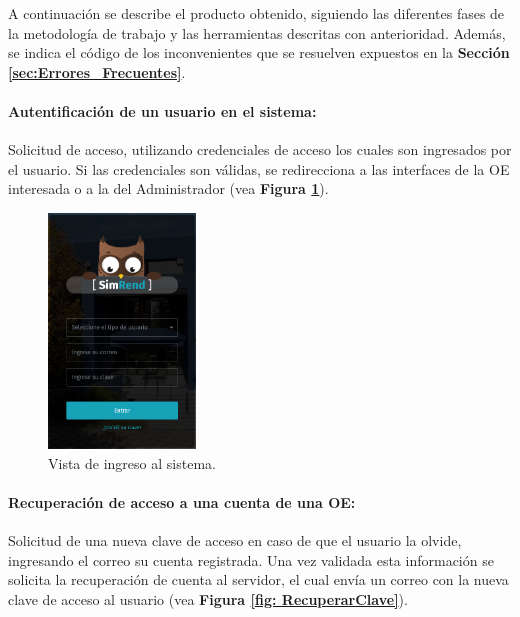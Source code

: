 A continuación se describe el producto obtenido, siguiendo las diferentes fases de la metodología de trabajo y las herramientas descritas con anterioridad. Además, se indica el código de los inconvenientes que se resuelven expuestos en la \textbf{Sección \ref{sec:Errores_Frecuentes}}.

\paragraph{Autentificación de un usuario en el sistema: } Solicitud de acceso, utilizando credenciales de acceso los cuales son ingresados por el usuario. Si las credenciales son válidas, se redirecciona a las interfaces de la OE interesada o a la del Administrador (vea \textbf{Figura \ref{fig: Login}}).

\begin{figure}[htbp]
    \centering
    \includegraphics[width=0.35\textwidth]{Imagenes/Login.PNG}
    \caption{\label{fig: Login}Vista de ingreso al sistema.}
\end{figure}

\paragraph{Recuperación de acceso a una cuenta de una OE: } Solicitud de una nueva clave de acceso en caso de que el usuario la olvide, ingresando el correo su cuenta registrada. Una vez validada esta información se solicita la recuperación de cuenta al servidor, el cual envía un correo con la nueva clave de acceso al usuario (vea \textbf{Figura \ref{fig: RecuperarClave}}).

